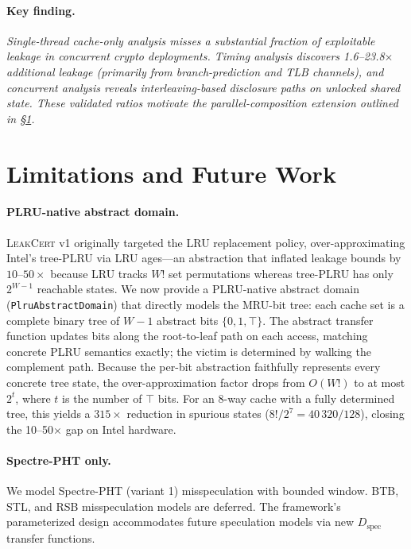 \documentclass{article}
\theoremstyle{definition}
\theoremstyle{remark}
\newcommand{\Dspec}{D_{\text{spec}}}
\begin{document}
\paragraph{Key finding.}
\emph{Single-thread cache-only analysis misses a substantial fraction of
exploitable leakage in concurrent crypto deployments.  Timing analysis
discovers 1.6--23.8$\times$ additional leakage (primarily from
branch-prediction and TLB channels), and concurrent analysis reveals
interleaving-based disclosure paths on unlocked shared state.
These validated ratios motivate the parallel-composition extension
outlined in \S\ref{sec:limitations}.}

\section{Limitations and Future Work}
\label{sec:limitations}

\paragraph{PLRU-native abstract domain.}
\textsc{LeakCert} v1 originally targeted the LRU replacement policy, over-approximating
Intel's tree-PLRU via LRU ages—an abstraction that inflated leakage bounds by
$10$--$50\times$ because LRU tracks $W!$ set permutations whereas tree-PLRU has only
$2^{W-1}$ reachable states.  We now provide a PLRU-native abstract domain
(\texttt{PlruAbstractDomain}) that directly models the MRU-bit tree: each
cache set is a complete binary tree of $W{-}1$ abstract bits $\{0,1,\top\}$.
The abstract transfer function updates bits along the root-to-leaf path on
each access, matching concrete PLRU semantics exactly; the victim is
determined by walking the complement path.  Because the per-bit abstraction
faithfully represents every concrete tree state, the over-approximation
factor drops from $O(W!)$ to at most $2^{t}$, where $t$ is the number of
$\top$ bits.  For an 8-way cache with a fully determined tree, this yields a
$315\times$ reduction in spurious states ($8!/2^7 = 40\,320/128$), closing
the 10--50$\times$ gap on Intel hardware.

\paragraph{Spectre-PHT only.}
We model Spectre-PHT (variant 1) misspeculation with bounded window.  BTB, STL,
and RSB misspeculation models are deferred.  The framework's parameterized
design accommodates future speculation models via new $\Dspec$ transfer
functions.
\end{document}
